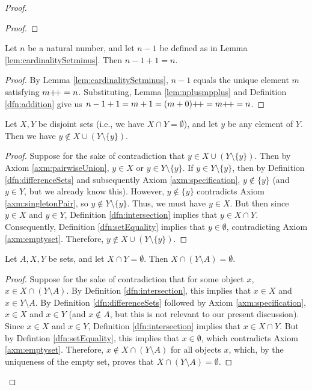 \documentclass[../main.tex]{subfiles}
\begin{document}
\begin{enumerate}[ref={\thesection.\arabic*}]
\begin{prp}
\begin{enumerate}[label={\textup{(}\alph*\textup{)}},ref={\theenumi\alph*}]
\begin{proof}
\begin{lem}
\begin{proof}
                    \end{proof}
                \end{lem}
                \begin{lem}\label{lem:n-1+1}
                    Let $n$ be a natural number, and let $n-1$ be defined as in Lemma \ref{lem:cardinalitySetminus}. Then $n-1+1=n$.
                    \begin{proof}
                        By Lemma \ref{lem:cardinalitySetminus}, $n-1$ equals the unique element $m$ satisfying $m{+\!+}=n$. Substituting, Lemma \ref{lem:nplusmpplus} and Definition \ref{dfn:addition} give us $n-1+1=m+1=(m+0){+\!+}=m{+\!+}=n$.
                    \end{proof}
                \end{lem}
                \begin{lem}\label{lem:disjointSetminus}
                    Let $X,Y$ be disjoint sets (i.e., we have $X\cap Y=\emptyset$), and let $y$ be any element of $Y$. Then we have $y\notin X\cup(Y\setminus\{y\})$.
                    \begin{proof}
                        Suppose for the sake of contradiction that $y\in X\cup(Y\setminus\{y\})$. Then by Axiom \ref{axm:pairwiseUnion}, $y\in X$ or $y\in Y\setminus\{y\}$. If $y\in Y\setminus\{y\}$, then by Definition \ref{dfn:differenceSets} and subsequently Axiom \ref{axm:specification}, $y\notin\{y\}$ (and $y\in Y$, but we already know this). However, $y\notin\{y\}$ contradicts Axiom \ref{axm:singletonPair}, so $y\notin Y\setminus\{y\}$. Thus, we must have $y\in X$. But then since $y\in X$ and $y\in Y$, Definition \ref{dfn:intersection} implies that $y\in X\cap Y$. Consequently, Definition \ref{dfn:setEquality} implies that $y\in\emptyset$, contradicting Axiom \ref{axm:emptyset}. Therefore, $y\notin X\cup(Y\setminus\{y\})$.
                    \end{proof}
                \end{lem}
                \begin{lem}\label{lem:intersectionSetminus}
                    Let $A,X,Y$ be sets, and let $X\cap Y=\emptyset$. Then $X\cap(Y\setminus A)=\emptyset$.
                    \begin{proof}
                        Suppose for the sake of contradiction that for some object $x$, $x\in X\cap(Y\setminus A)$. By Definition \ref{dfn:intersection}, this implies that $x\in X$ and $x\in Y\setminus A$. By Definition \ref{dfn:differenceSets} followed by Axiom \ref{axm:specification}, $x\in X$ and $x\in Y$ (and $x\notin A$, but this is not relevant to our present discussion). Since $x\in X$ and $x\in Y$, Definition \ref{dfn:intersection} implies that $x\in X\cap Y$. But by Defintion \ref{dfn:setEquality}, this implies that $x\in\emptyset$, which contradicts Axiom \ref{axm:emptyset}. Therefore, $x\notin X\cap(Y\setminus A)$ for all objects $x$, which, by the uniqueness of the empty set, proves that $X\cap(Y\setminus A)=\emptyset$.

\end{proof}
\end{lem}
\end{proof}
\end{enumerate}
\end{prp}
\end{enumerate}
\end{document}
